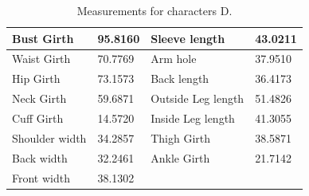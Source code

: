 \begin{table}[H]
    \centering
    \begin{tabular}{|p{3.4cm}|p{1.8cm}|p{3.4cm}|p{1.8cm}|}
        \hline
        Bust Girth & 95.8160 & Sleeve length & 43.0211\\
        \hline
        Waist Girth & 70.7769 & Arm hole & 37.9510\\
        \hline
        Hip Girth & 73.1573 & Back length & 36.4173\\
        \hline
        Neck Girth &59.6871 & Outside Leg length & 51.4826\\
        \hline
        Cuff Girth &14.5720 & Inside Leg length & 41.3055\\
        \hline
        Shoulder width &34.2857 & Thigh Girth & 38.5871\\
        \hline
        Back width &32.2461 & Ankle  Girth & 21.7142\\
        \hline
        Front width &38.1302 &  &  \\
        \hline        
    \end{tabular}
    \caption{Measurements for characters D.} %
    \label{table:measurements_result_D}
\end{table}

